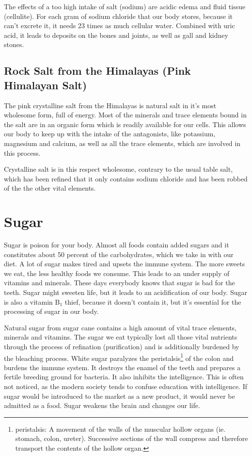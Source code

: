 \documentclass[../main.tex]{subfiles}
\begin{document}
The effects of a too high intake of salt (sodium) are acidic edema 
and fluid tissue (cellulite).
For each gram of sodium chloride that our body stores, because it can't excrete it, it needs 23 times as much cellular water.
Combined with uric acid, it leads to deposits on the bones and joints,
as well as gall and kidney stones.

\subsection[Pink Himalayan Salt]{Rock Salt from the Himalayas (Pink Himalayan Salt)}

The pink crystalline salt from the Himalayas is natural salt in it's most wholesome form, full of energy.
Most of the minerals and trace elements bound in the salt are in an organic form which is readily available for our cells.
This allows our body to keep up with the intake of the antagonists, like potassium, magnesium and calcium,
as well as all the trace elements, which are involved in this process.

Crystalline salt is in this respect wholesome, contrary to the usual table salt,
which has been refined that it only contains sodium chloride and has been robbed of the the other vital elements.

\section{Sugar}

Sugar is poison for your body.
Almost all foods contain added sugars and it constitutes about 50 percent of the carbohydrates, which we take in with our diet.
A lot of sugar makes tired and upsets the immune system.
The more sweets we eat, the less healthy foods we consume.
This leads to an under supply of vitamins and minerals.
These days everybody knows that sugar is bad for the teeth.
Sugar might sweeten life, but it leads to an acidification of our body.
Sugar is also a vitamin B$_1$ thief, because it doesn't contain it,
but it's essential for the processing of sugar in our body.

Natural sugar from sugar cane contains a high amount of vital trace elements, minerals and vitamins.
The sugar we eat typically lost all those vital nutrients through the process of refination (purification)
and is additionally burdened by the bleaching process.
White sugar paralyzes the peristalsis\footnote{peristalsis: A movement of the walls of the muscular hollow organs (ie. stomach, colon, ureter).
Successive sections of the wall compress and therefore transport the contents of the hollow organ.}
of the colon and burdens the immune system.
It destroys the enamel of the teeth and prepares a fertile breeding ground for bacteria.
It also inhibits the intelligence. This is often not noticed, as the modern society tends to confuse education with intelligence.
If sugar would be introduced to the market as a new product, it would never be  admitted as a food.
Sugar weakens the brain and changes our life.
\end{document}
